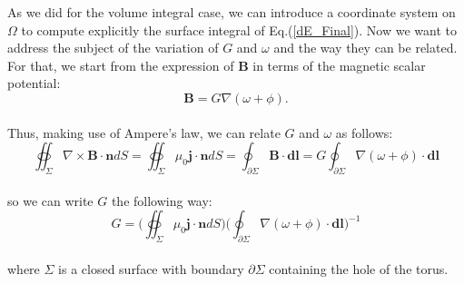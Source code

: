\documentclass[aps,prc,floatfix,showkeys,nofootinbib]{revtex4-1}
\newcommand{\beq}{\begin{equation}}
\newcommand{\eeq}{\end{equation}}
\newcommand{\BB}{\textbf{B}}
\newcommand{\grad}{\nabla}
\newcommand{\rot}{\nabla \times}
\begin{document}
As we did for the volume integral case, we can introduce a coordinate system on $\Omega$ to compute explicitly the surface integral of Eq.(\ref{dE_Final}). Now we want to address the subject of the variation of $G$ and $\omega$ and the way they can be related. For that, we start from the expression of $\BB$ in terms of the magnetic scalar potential:\\

\beq
\BB = G \grad(\omega + \phi). 
\eeq\\

\noindent Thus, making use of Ampere's law, we can relate $G$ and $\omega$ as follows:\\

\beq
\oiint_{\Sigma} \rot \BB \cdot \mathbf{n} dS = \oiint_{\Sigma} \mu_0 \mathbf{j} \cdot \mathbf{n} dS =\oint_{\partial \Sigma} \BB \cdot \mathbf{dl} = G\oint_{\partial \Sigma}\grad(\omega + \phi)\cdot \mathbf{dl}
\eeq\\

\noindent so we can write $G$ the following way:\\

\beq
G = \Bigg( \oiint_{\Sigma} \mu_0 \mathbf{j} \cdot \mathbf{n} dS \Bigg)  \Bigg( \oint_{\partial \Sigma}\grad(\omega + \phi)\cdot \mathbf{dl} \Bigg)^{-1}
\eeq\\

\noindent where $\Sigma$ is a closed surface with boundary  $\partial \Sigma$ containing the hole of the torus.
\end{document}
